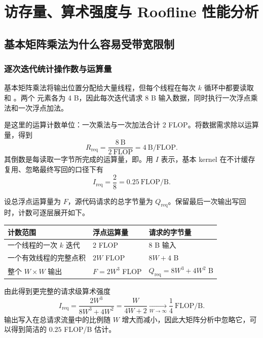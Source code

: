 \section{访存量、算术强度与 Roofline 性能分析}

\subsection{基本矩阵乘法为什么容易受带宽限制}

\subsubsection{逐次迭代统计操作数与运算量}
基本矩阵乘法将输出位置分配给大量线程，但每个线程在每次 $k$ 循环中都要读取  和 。两个  元素各为 4 B，因此每次迭代请求 8 B 输入数据，同时执行一次浮点乘法和一次浮点加法。

是这里的运算计数单位：一次乘法与一次加法合计 2 FLOP。将数据需求除以运算量，得到
\begin{equation}
R_{\mathrm{req}}
=\frac{8\ \mathrm{B}}{2\ \mathrm{FLOP}}
=4\ \mathrm{B/FLOP}.
\label{l5:eq:byte-per-flop}
\end{equation}
其倒数是每读取一字节所完成的运算量，即。用 $I$ 表示，基本 kernel 在不计缓存复用、忽略最终写回的口径下有
\begin{equation}
I_{\mathrm{req}}=\frac{2}{8}
=0.25\ \mathrm{FLOP/B}.
\label{l5:eq:naive-intensity}
\end{equation}

设总浮点运算量为 $F$，源代码请求的总字节量为 $Q_{\mathrm{req}}$。保留最后一次输出写回时，计数可逐层展开如下。
\begin{table}[H]
\centering\small
\begin{tabularx}{\textwidth}{L{0.29\textwidth} Y Y}
\toprule
计数范围 & 浮点运算量 & 请求的字节量 \\
\midrule
一个线程的一次 $k$ 迭代 & 2 FLOP & 8 B 输入 \\
一个有效线程的完整点积 & $2W$ FLOP & $8W+4$ B \\
整个 $W\times W$ 输出 & $F=2W^3$ FLOP & $Q_{\mathrm{req}}=8W^3+4W^2$ B \\
\bottomrule
\end{tabularx}
\end{table}
由此得到更完整的请求级算术强度
\begin{equation}
I_{\mathrm{req}}=\frac{2W^3}{8W^3+4W^2}
=\frac{W}{4W+2}
\xrightarrow[W\to\infty]{}\frac14\ \mathrm{FLOP/B}.
\label{l5:eq:naive-exact}
\end{equation}
输出写入在总请求流量中的比例随 $W$ 增大而减小，因此大矩阵分析中忽略它，可以得到简洁的 $0.25$ FLOP/B 估计。

